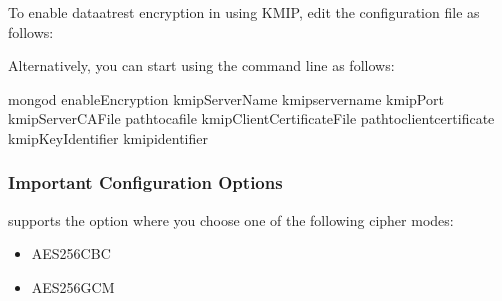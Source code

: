 \documentclass[letterpaper,10pt,english]{sphinxmanual}
\begin{document}
\sphinxAtStartPar
To enable data\sphinxhyphen{}at\sphinxhyphen{}rest encryption in  using KMIP, edit the  configuration file as follows:

\begin{sphinxVerbatim}[commandchars=\\\{\}]
\end{sphinxVerbatim}

\sphinxAtStartPar
Alternatively, you can start  using the command line as follows:

\begin{sphinxVerbatim}[commandchars=\\\{\}]
\PYGZdl{} mongod \PYGZhy{}\PYGZhy{}enableEncryption 
  \PYGZhy{}\PYGZhy{}kmipServerName \PYGZlt{}kmip\PYGZus{}servername\PYGZgt{} 
  \PYGZhy{}\PYGZhy{}kmipPort  
  \PYGZhy{}\PYGZhy{}kmipServerCAFile \PYGZlt{}path\PYGZus{}to\PYGZus{}ca\PYGZus{}file\PYGZgt{} 
  \PYGZhy{}\PYGZhy{}kmipClientCertificateFile \PYGZlt{}path\PYGZus{}to\PYGZus{}client\PYGZus{}certificate\PYGZgt{} 
  \PYGZhy{}\PYGZhy{}kmipKeyIdentifier \PYGZlt{}kmip\PYGZus{}identifier\PYGZgt{}
\end{sphinxVerbatim}
\subsubsection*{Important Configuration Options}

\sphinxAtStartPar
{} supports the  option where you choose one of the following cipher modes:
\begin{itemize}
\item {} 
\sphinxAtStartPar
AES256\sphinxhyphen{}CBC

\item {} 
\sphinxAtStartPar
AES256\sphinxhyphen{}GCM

\end{itemize}
\end{document}

